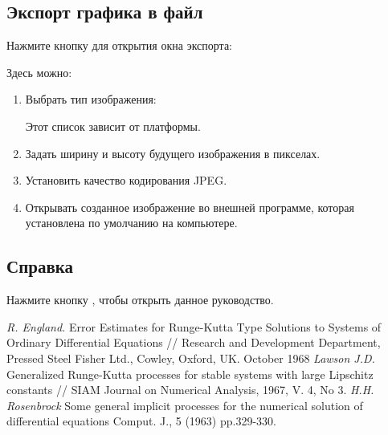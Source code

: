\documentclass[12pt]{article}
\begin{document}
\subsection{Экспорт графика в файл}

Нажмите кнопку   для открытия окна экспорта:


Здесь можно:
\begin{enumerate}
\item Выбрать тип изображения:


Этот список зависит от платформы.
\item Задать ширину и высоту будущего изображения в пикселах.
\item Установить качество кодирования JPEG.
\item Открывать созданное изображение во внешней программе, 
которая установлена по умолчанию на компьютере.
\end{enumerate}


\subsection{Справка}

Нажмите кнопку , чтобы открыть данное руководство.



\begin{thebibliography}{9}
\textit{R. England.} Error Estimates for Runge-Kutta Type Solutions to Systems of 
Ordinary Differential Equations 
// Research and Development Department, Pressed Steel Fisher Ltd., Cowley, Oxford, UK. October 1968
\textit{Lawson J.D.} Generalized Runge-Kutta processes for stable systems with large Lipschitz constants 
// SIAM Journal on Numerical Analysis, 1967, V. 4, No 3.
\textit{H.H. Rosenbrock} Some general implicit processes for the numerical solution of differential equations
Comput. J., 5 (1963) pp.329-330.
\end{thebibliography}
\end{document}
